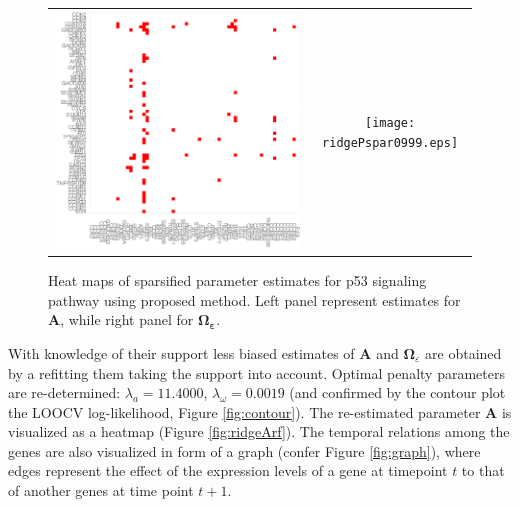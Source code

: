 \documentclass[a4paper]{article}
\begin{document}
\begin{figure}[h!]
\centering
\begin{tabular}{cc}
\includegraphics[scale=0.33]{ridgeAspar0999.eps}&
\texttt{[image: ridgePspar0999.eps]}\\
\end{tabular}
\caption{Heat maps of sparsified parameter estimates for p53 signaling pathway using proposed method. Left panel represent estimates for $\mathbf{A}$, while right panel for $\boldsymbol{\Omega_{\varepsilon}}$.}
\label{fig:ridgeAPspar}
\end{figure}

With knowledge of their support less biased estimates of $\mathbf{A}$ and $\mathbf{\Omega}_{\varepsilon}$ are obtained by a refitting them taking the support into account. Optimal penalty parameters are re-determined: $\lambda_a=11.4000$, $\lambda_{\omega}= 0.0019$ (and confirmed by the contour plot the LOOCV log-likelihood, Figure \ref{fig:contour}). The re-estimated parameter $\mathbf{A}$ is visualized as a heatmap (Figure \ref{fig:ridgeArf}). The temporal relations among the genes are also visualized in form of a graph (confer  Figure  \ref{fig:graph}), where edges represent the effect of the expression levels of a gene at timepoint $t$ to that of another genes at time point $t+1$.  
\end{document}
